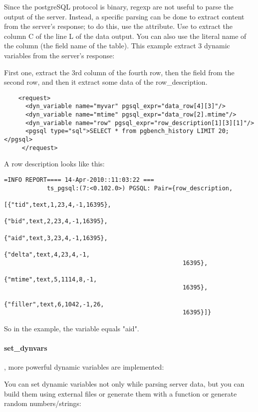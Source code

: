 \documentclass{TSUNG-en}
\begin{document}
Since the  postgreSQL protocol is binary, regexp are not useful to
parse the output of the server. Instead, a specific parsing can be
done to extract content from the server's response; to do this, use the
 attribute. Use  to
extract the  column C of the  line L of the data output. You can also use
the literal name of the column (\ie the field name of the
table). This example extract 3 dynamic variables from the server's
response:

First one, extract the 3rd column of the fourth row, then the 
field from the second row, and then it extract some data of the
row\_description.

\begin{Verbatim}
    <request>
      <dyn_variable name="myvar" pgsql_expr="data_row[4][3]"/>
      <dyn_variable name="mtime" pgsql_expr="data_row[2].mtime"/>
      <dyn_variable name="row" pgsql_expr="row_description[1][3][1]"/>
      <pgsql type="sql">SELECT * from pgbench_history LIMIT 20;</pgsql>
     </request>
\end{Verbatim}

A row description looks like this:
\begin{Verbatim}
=INFO REPORT==== 14-Apr-2010::11:03:22 ===
            ts_pgsql:(7:<0.102.0>) PGSQL: Pair={row_description,
                                                [{"tid",text,1,23,4,-1,16395},
                                                 {"bid",text,2,23,4,-1,16395},
                                                 {"aid",text,3,23,4,-1,16395},
                                                 {"delta",text,4,23,4,-1,
                                                  16395},
                                                 {"mtime",text,5,1114,8,-1,
                                                  16395},
                                                 {"filler",text,6,1042,-1,26,
                                                  16395}]}
\end{Verbatim}

So in the example, the  variable equals "aid".

\paragraph{set\_dynvars}

, more powerful dynamic variables are implemented:

You can set dynamic variables not only while parsing server data, but
you can build them using external files or generate them with a function
or generate random numbers/strings:
\end{document}

